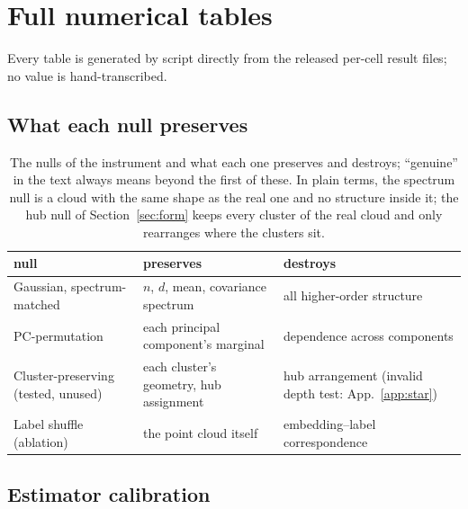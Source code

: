 \appendix
\section{Full numerical tables}
\label{app:tables}
Every table is generated by script directly from the released per-cell result files; no value is hand-transcribed.

\FloatBarrier
\subsection{What each null preserves}
\label{app:nulls}
\begin{table}[H]
\centering\footnotesize
\begin{tabular}{p{3.1cm} p{4.2cm} p{5.1cm}}
\toprule
null & preserves & destroys \\
\midrule
Gaussian, spectrum-matched & $n$, $d$, mean, covariance spectrum & all higher-order structure \\
PC-permutation & each principal component's marginal & dependence across components \\
Cluster-preserving (tested, unused) & each cluster's geometry, hub assignment & hub arrangement (invalid depth test: App.~\ref{app:star}) \\
Label shuffle (ablation) & the point cloud itself & embedding--label correspondence \\
\bottomrule
\end{tabular}
\caption{The nulls of the instrument and what each one preserves and destroys; ``genuine'' in the text always means beyond the first of these. In plain terms, the spectrum null is a cloud with the same shape as the real one and no structure inside it; the hub null of Section~\ref{sec:form} keeps every cluster of the real cloud and only rearranges where the clusters sit.}
\label{tab:nulls}
\end{table}

\FloatBarrier
\subsection{Estimator calibration}
\label{app:calibration}



\FloatBarrier

